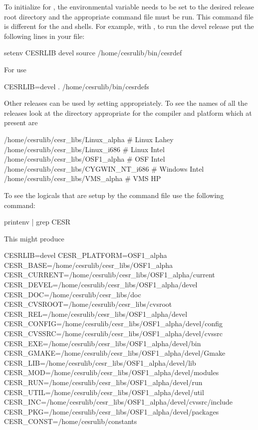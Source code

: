 To initialize for \bmad, the  environmental variable needs
to be set to the desired release root directory and the appropriate
command file must be run. This command file is different for the
 and  shells. For example, with , to run
the devel release put the following lines in your  file:
\begin{example}
  setenv CESRLIB devel
  source /home/cesrulib/bin/cesrdef
\end{example}
For  use
\begin{example}
    CESRLIB=devel
    . /home/cesrulib/bin/cesrdefs
\end{example}
Other releases can be used by setting  appropriately. To
see the names of all the releases look at the directory appropriate
for the compiler and platform which at present are
\begin{example}
  /home/cesrulib/cesr_libs/Linux_alpha       # Linux    Lahey
  /home/cesrulib/cesr_libs/Linux_i686        # Linux    Intel
  /home/cesrulib/cesr_libs/OSF1_alpha        # OSF      Intel
  /home/cesrulib/cesr_libs/CYGWIN_NT_i686    # Windows  Intel
  /home/cesrulib/cesr_libs/VMS_alpha         # VMS      HP
\end{example}

To see the logicals that are setup by the  command file
use the following command:
\begin{example}
  printenv | grep CESR
\end{example}
This might produce
\begin{example}
  CESRLIB=devel
  CESR_PLATFORM=OSF1_alpha
  CESR_BASE=/home/cesrulib/cesr_libs/OSF1_alpha
  CESR_CURRENT=/home/cesrulib/cesr_libs/OSF1_alpha/current
  CESR_DEVEL=/home/cesrulib/cesr_libs/OSF1_alpha/devel
  CESR_DOC=/home/cesrulib/cesr_libs/doc
  CESR_CVSROOT=/home/cesrulib/cesr_libs/cvsroot
  CESR_REL=/home/cesrulib/cesr_libs/OSF1_alpha/devel
  CESR_CONFIG=/home/cesrulib/cesr_libs/OSF1_alpha/devel/config
  CESR_CVSSRC=/home/cesrulib/cesr_libs/OSF1_alpha/devel/cvssrc
  CESR_EXE=/home/cesrulib/cesr_libs/OSF1_alpha/devel/bin
  CESR_GMAKE=/home/cesrulib/cesr_libs/OSF1_alpha/devel/Gmake
  CESR_LIB=/home/cesrulib/cesr_libs/OSF1_alpha/devel/lib
  CESR_MOD=/home/cesrulib/cesr_libs/OSF1_alpha/devel/modules
  CESR_RUN=/home/cesrulib/cesr_libs/OSF1_alpha/devel/run
  CESR_UTIL=/home/cesrulib/cesr_libs/OSF1_alpha/devel/util
  CESR_INC=/home/cesrulib/cesr_libs/OSF1_alpha/devel/cvssrc/include
  CESR_PKG=/home/cesrulib/cesr_libs/OSF1_alpha/devel/packages
  CESR_CONST=/home/cesrulib/constants
\end{example}

